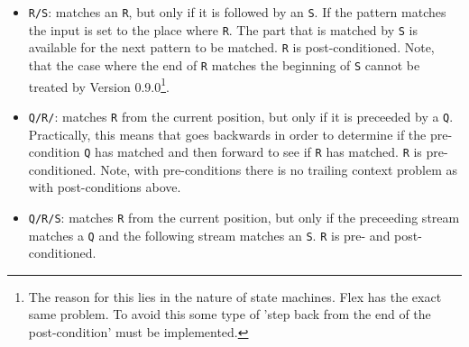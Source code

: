 \begin{itemize}

\item {\tt R/S}: matches an {\tt R}, but only if it is followed by an {\tt S}. If the 
                 pattern matches the input is set to the place where {\tt R}. The part
		 that is matched by {\tt S} is available for the next pattern to be matched.
                 {\tt R} is post-conditioned.
		 Note, that the case where the end of {\tt R} matches the beginning of 
                 {\tt S} cannot be treated by Version 0.9.0\footnote{The reason for this lies in the 
		 nature of state machines. Flex has the exact same problem. To avoid this
		     some type of 'step back from the end of the post-condition' must be
		     implemented.}.
		 
\item {\tt Q/R/}: matches {\tt R} from the current position, but only if it is 
                  preceeded by a {\tt Q}. Practically, this means that {\quex} goes
		  backwards in order to determine if the pre-condition {\tt Q} has matched 
		  and then forward to see if {\tt R} has matched. {\tt R} is pre-conditioned.
		  Note, with pre-conditions there is no trailing context problem as with 
		  post-conditions above.
                  
\item {\tt Q/R/S}: matches {\tt R} from the current position, but only if the preceeding
                   stream matches a {\tt Q} and the following stream matches an {\tt S}.
                   {\tt R} is pre- and post-conditioned.

\end{itemize}

